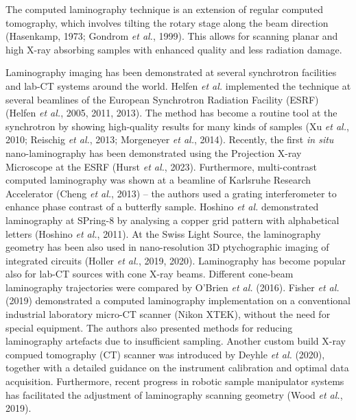 \documentclass{article}
\begin{document}
The computed laminography technique is an extension of regular computed tomography, which involves tilting the rotary stage along the beam direction (Hasenkamp, 1973; Gondrom \emph{et al.}, 1999). This allows for scanning planar and high X-ray absorbing samples with enhanced quality and less radiation damage.

Laminography imaging has been demonstrated at several synchrotron facilities and lab-CT systems around the world. Helfen \emph{et al.} implemented the technique at several beamlines of the European Synchrotron Radiation Facility (ESRF) (Helfen \emph{et al.}, 2005, 2011, 2013). The method has become a routine tool at the synchrotron by showing high-quality results for many kinds of samples (Xu \emph{et al.}, 2010; Reischig \emph{et al.}, 2013; Morgeneyer \emph{et al.}, 2014). Recently, the first \emph{in situ} nano-laminography has been demonstrated using the Projection X-ray Microscope at the ESRF (Hurst \emph{et al.}, 2023). Furthermore, multi-contrast computed laminography was shown at a beamline of Karlsruhe Research Accelerator (Cheng \emph{et al.}, 2013) – the authors used a grating interferometer to enhance phase contrast of a butterfly sample. Hoshino \emph{et al.} demonstrated laminography at SPring-8 by analysing a copper grid pattern with alphabetical letters (Hoshino \emph{et al.}, 2011). At the Swiss Light Source, the laminography geometry has been also used in nano-resolution 3D ptychographic imaging of integrated circuits (Holler \emph{et al.}, 2019, 2020). Laminography has become popular also for lab-CT sources with cone X-ray beams. Different cone-beam laminography trajectories were compared by O’Brien \emph{et al.} (2016). Fisher \emph{et al.} (2019) demonstrated a computed laminography implementation on a conventional industrial laboratory micro-CT scanner (Nikon XTEK), without the need for special equipment. The authors also presented methods for reducing laminography artefacts due to insufficient sampling. Another custom build X-ray compued tomography (CT) scanner was introduced by Deyhle \emph{et al.} (2020), together with a detailed guidance on the instrument calibration and optimal data acquisition. Furthermore, recent progress in robotic sample manipulator systems has facilitated the adjustment of laminography scanning geometry (Wood \emph{et al.}, 2019).
\end{document}
